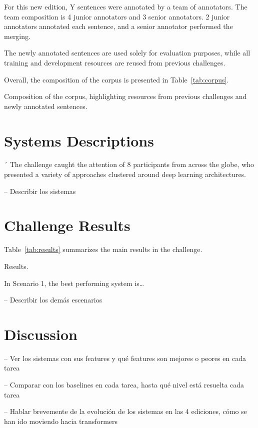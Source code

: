 \documentclass[a4paper,11pt,twocolumn,twoside]{article}
\begin{document}
For this new edition, Y sentences were annotated by a team of annotators.
The team composition is 4 junior annotators and 3 senior annotators.
2 junior annotators annotated each sentence, and a senior annotator performed the merging.

The newly annotated sentences are used solely for evaluation purposes,
while all training and development resources are reused from previous challenges.

Overall, the composition of the corpus is presented in Table~\ref{tab:corpus}.

\begin{table}
  \caption{Composition of the corpus, highlighting resources from previous
  challenges and newly annotated sentences.\label{tab:corpus}}
\end{table}

\section{Systems Descriptions}
´
The challenge caught the attention of 8 participants from across the globe,
who presented a variety of approaches clustered around deep learning architectures.

-- Describir los sistemas

\section{Challenge Results}

Table~\ref{tab:results} summarizes the main results in the challenge.

\begin{table}
  \caption{Results.\label{tab:results}}
\end{table}

In Scenario 1, the best performing system is\dots

-- Describir los demás escenarios

\section{Discussion}

-- Ver los sistemas con sus features y qué features son mejores o peores en cada tarea

-- Comparar con los baselines en cada tarea, hasta qué nivel está resuelta cada tarea

-- Hablar brevemente de la evolución de los sistemas en las 4 ediciones,
cómo se han ido moviendo hacia transformers
\end{document}
